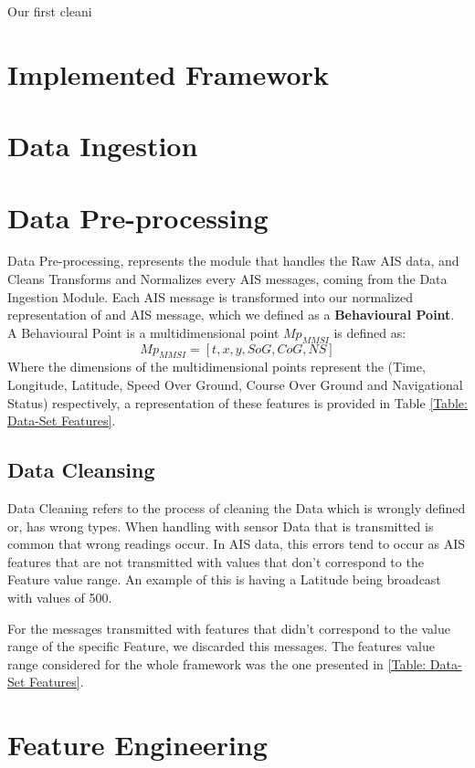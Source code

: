 Our first cleani

\section{Implemented Framework}


\section{Data Ingestion}

\section{Data Pre-processing}
Data Pre-processing, represents the module that handles the Raw AIS data, and Cleans Transforms and Normalizes every AIS messages, coming from the Data Ingestion Module. Each AIS message is transformed into our normalized representation of and AIS message, which we defined as a \textbf{Behavioural Point}. A Behavioural Point is a multidimensional point $Mp_{MMSI}$ is defined as:
\[Mp_{MMSI} = [t, x, y, SoG, CoG, NS]\]
Where the dimensions of the multidimensional points represent the (Time, Longitude, Latitude, Speed Over Ground, Course Over Ground and Navigational Status) respectively, a representation of these features is provided in Table 
\ref{Table: Data-Set Features}.

\subsection{Data Cleansing}
Data Cleaning refers to the process of cleaning the Data which is wrongly defined or, has wrong types. When handling with sensor Data that is transmitted is common that wrong readings occur. In AIS data, this errors tend to occur as AIS features that are not transmitted with values that don't correspond to the Feature value range. An example of this is having a Latitude being broadcast with values of 500.

For the messages transmitted with features that didn't correspond to the value range of the specific Feature, we discarded this messages. The features value range considered for the whole framework was the one presented in \ref{Table: Data-Set Features}.

\section{Feature Engineering}
